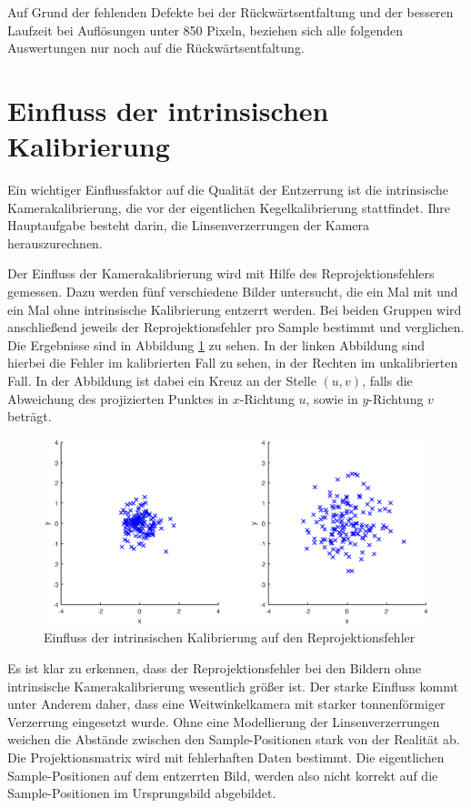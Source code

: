 Auf Grund der fehlenden Defekte bei der Rückwärtsentfaltung und der besseren Laufzeit bei Auflösungen unter 850 Pixeln, beziehen sich alle folgenden Auswertungen nur noch auf die Rückwärtsentfaltung.


\section{Einfluss der intrinsischen Kalibrierung}
Ein wichtiger Einflussfaktor auf die Qualität der Entzerrung ist die intrinsische Kamerakalibrierung, die vor der eigentlichen Kegelkalibrierung stattfindet. Ihre Hauptaufgabe besteht darin, die Linsenverzerrungen der Kamera herauszurechnen.

Der Einfluss der Kamerakalibrierung wird mit Hilfe des Reprojektionsfehlers gemessen. Dazu werden fünf verschiedene Bilder untersucht, die ein Mal mit und ein Mal ohne intrinsische Kalibrierung entzerrt werden. Bei beiden Gruppen wird anschließend jeweils der Reprojektionsfehler pro Sample bestimmt und verglichen. Die Ergebnisse sind in Abbildung \ref{fig:influenceCalib} zu sehen. In der linken Abbildung sind hierbei die Fehler im kalibrierten Fall zu sehen, in der Rechten im unkalibrierten Fall. In der Abbildung ist dabei ein Kreuz an der Stelle $(u,v)$, falls die Abweichung des projizierten Punktes in $x$-Richtung $u$, sowie in $y$-Richtung $v$ beträgt.

\begin{figure}[!htb]
	\centering
	\includegraphics[width=\textwidth]{images/reprojectionErrorReverse.eps}
	\caption{Einfluss der intrinsischen Kalibrierung auf den Reprojektionsfehler}
	\label{fig:influenceCalib}
\end{figure}


Es ist klar zu erkennen, dass der Reprojektionsfehler bei den Bildern ohne intrinsische Kamerakalibrierung wesentlich größer ist. Der starke Einfluss kommt unter Anderem daher, dass eine Weitwinkelkamera mit starker tonnenförmiger Verzerrung eingesetzt wurde. Ohne eine Modellierung der Linsenverzerrungen weichen die Abstände zwischen den Sample-Positionen stark von der Realität ab. Die Projektionsmatrix wird mit fehlerhaften Daten bestimmt. Die eigentlichen Sample-Positionen auf dem entzerrten Bild, werden also nicht korrekt auf die Sample-Positionen im Ursprungsbild abgebildet.

